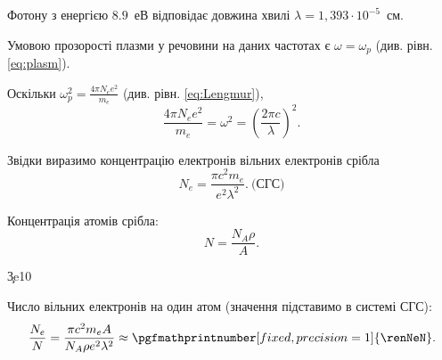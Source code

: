 
\begin{solutionexample}

	Фотону з енергією $8.9$~еВ відповідає довжина хвилі $\lambda = 1,393 \cdot 10^{-5}$~см.

	Умовою прозорості плазми у речовини на даних частотах є $\omega = \omega_p$ (див. рівн.\eqref{eq:plasm}).

	Оскільки $\omega_p^2 = \frac{4\pi N_e e^2}{m_e}$ (див. рівн. \eqref{eq:Lengmur}),
	\begin{equation*}
		\frac{4\pi N_e e^2}{m_e} = \omega^2 = \left( \frac{2\pi c}{\lambda} \right)^2.
	\end{equation*}

	Звідки виразимо концентрацію електронів вільних електронів срібла
	\begin{equation*}
		N_e = \frac{\pi c^2  m_e}{e^2 \lambda^2}.\  \text{(СГС)}
	\end{equation*}

	Концентрація атомів срібла:
	\begin{equation*}
		N = \frac{N_A \rho}{A}.
	\end{equation*}

	\pgfmathsetmacro{}
	\pgfmathsetmacro\c{3e10}
	\pgfmathsetmacro{}
	\pgfmathsetmacro{}
	\pgfmathsetmacro{}
	\pgfmathsetmacro{}
	\pgfmathsetmacro{}
	\pgfmathsetmacro\renNeN{\pgfmathresult}

	Число вільних електронів на один атом (значення підставимо в системі СГС):
	\begin{equation*}
		\frac{N_e}{N} = \frac{\pi c^2  m_e A }{N_A \rho e^2  \lambda^2} \approx \pgfmathprintnumber[fixed, precision=1]{\renNeN}.
	\end{equation*}

\end{solutionexample}




